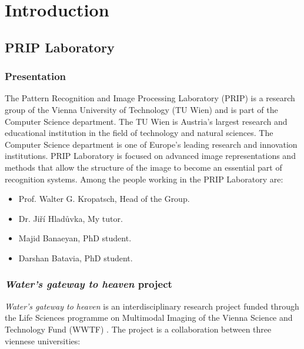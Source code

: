 \chapter{Introduction}

\section{PRIP Laboratory}

\subsection{Presentation}

The Pattern Recognition and Image Processing Laboratory (PRIP) is a research
group of the Vienna University of Technology (TU Wien) and is part of the
Computer Science department. The TU Wien is Austria's largest research and 
educational institution in the field of technology and natural sciences.
The Computer Science department is one of Europe's leading research and innovation 
institutions. PRIP Laboratory is focused on advanced image representations and methods 
that allow the structure of the image to become an essential part of recognition systems.
Among the people working in the PRIP Laboratory are:

\begin{itemize}
    \item Prof. Walter G. Kropatsch, Head of the Group.
    \item Dr. Jiří Hladůvka, My tutor.
    \item Majid Banaeyan, PhD student.
    \item Darshan Batavia, PhD student.
\end{itemize}

\subsection{\textit{Water's gateway to heaven} project}

\textit{Water's gateway to heaven} is an interdisciplinary research project funded 
through the Life Sciences programme on Multimodal Imaging of the Vienna Science and 
Technology Fund (WWTF) \cite{WWTF}. The project is a collaboration between three viennese 
universities: 

